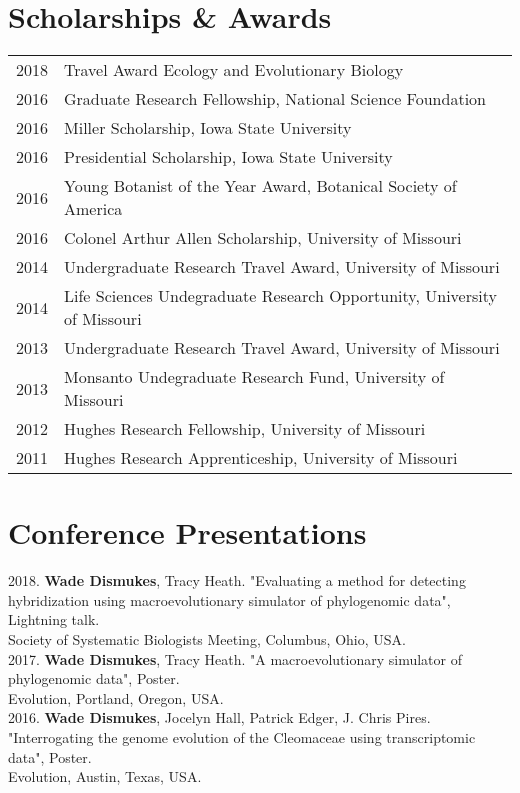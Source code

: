 \documentclass[12pt]{article}
\begin{document}
\section{Scholarships \& Awards}
\begin{tabular}{rl}
 2018 & Travel Award Ecology and Evolutionary Biology \\
 2016 & Graduate Research Fellowship, National Science Foundation \\
 2016 & Miller Scholarship, Iowa State University \\ 
 2016 & Presidential Scholarship, Iowa State University \\
 2016 & Young Botanist of the Year Award, Botanical Society of America \\ 
 2016 & Colonel Arthur Allen Scholarship, University of Missouri \\
 2014 & Undergraduate Research Travel Award, University of Missouri \\
 2014 & Life Sciences Undegraduate Research Opportunity,  University of Missouri \\
 2013 & Undergraduate Research Travel Award, University of Missouri \\
 2013 & Monsanto Undegraduate Research Fund,  University of Missouri \\
 2012 & Hughes Research Fellowship,  University of Missouri \\
 2011 & Hughes Research Apprenticeship,  University of Missouri \\

\end{tabular}

\section{Conference Presentations}
2018. \textbf{Wade Dismukes}, Tracy Heath. "Evaluating a method for detecting hybridization using macroevolutionary simulator of phylogenomic data", Lightning talk. \\
Society of Systematic Biologists Meeting, Columbus, Ohio, USA. \\

2017. \textbf{Wade Dismukes}, Tracy Heath. "A macroevolutionary simulator of phylogenomic data", Poster.\\ Evolution, Portland, Oregon, USA. \\

2016. \textbf{Wade Dismukes}, Jocelyn Hall, Patrick Edger, J. Chris Pires. "Interrogating the genome evolution of the Cleomaceae using transcriptomic data", Poster. \\
Evolution, Austin, Texas, USA. \\
\end{document}
